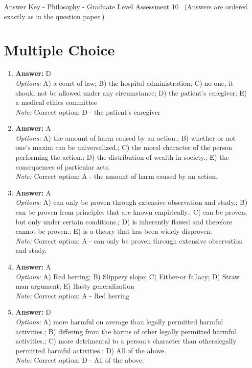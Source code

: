 \documentclass[12pt]{article}
\begin{document}
\begin{center}
Answer Key - Philosophy - Graduate Level Assessment 10 \
\small (Answers are ordered exactly as in the question paper.)
\end{center}

\section*{Multiple Choice}
\begin{enumerate}[label=\arabic*.]
\item \textbf{Answer:} D
\\ \textit{Options:} A) a court of law; B) the hospital administration; C) no one, it should not be allowed under any circumstance; D) the patient's caregiver; E) a medical ethics committee
\\ \textit{Note:} Correct option: D - the patient's caregiver
\item \textbf{Answer:} A
\\ \textit{Options:} A) the amount of harm caused by an action.; B) whether or not one's maxim can be universalized.; C) the moral character of the person performing the action.; D) the distribution of wealth in society.; E) the consequences of particular acts.
\\ \textit{Note:} Correct option: A - the amount of harm caused by an action.
\item \textbf{Answer:} A
\\ \textit{Options:} A) can only be proven through extensive observation and study.; B) can be proven from principles that are known empirically.; C) can be proven, but only under certain conditions.; D) is inherently flawed and therefore cannot be proven.; E) is a theory that has been widely disproven.
\\ \textit{Note:} Correct option: A - can only be proven through extensive observation and study.
\item \textbf{Answer:} A
\\ \textit{Options:} A) Red herring; B) Slippery slope; C) Either-or fallacy; D) Straw man argument; E) Hasty generalization
\\ \textit{Note:} Correct option: A - Red herring
\item \textbf{Answer:} D
\\ \textit{Options:} A) more harmful on average than legally permitted harmful activities.; B) differing from the harms of other legally permitted harmful activities.; C) more detrimental to a person's character than otherslegally permitted harmful activities.; D) All of the above.
\\ \textit{Note:} Correct option: D - All of the above.
\end{enumerate}
\end{document}
